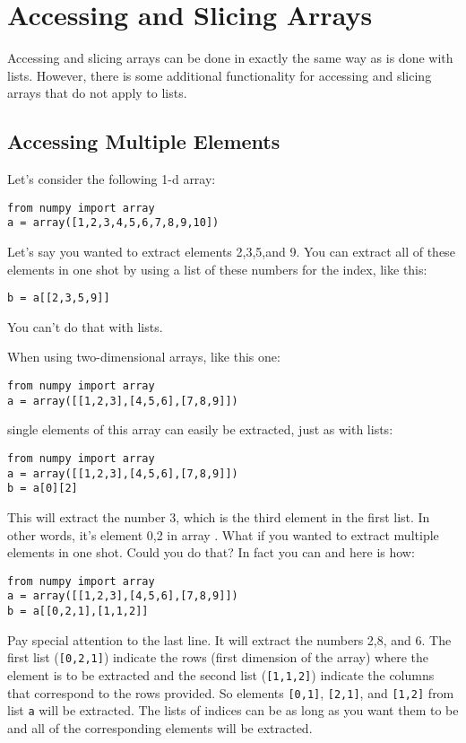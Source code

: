 \section{Accessing and Slicing Arrays}
Accessing and slicing arrays can be done in exactly the same way as is
done with lists.  However, there is some additional functionality for
accessing and slicing arrays that do not apply to lists.
\subsection*{Accessing Multiple Elements}
Let's consider the following 1-d array:
\begin{Verbatim}
from numpy import array
a = array([1,2,3,4,5,6,7,8,9,10])
\end{Verbatim}
Let's say you wanted to extract elements 2,3,5,and 9.  You can extract
all of these elements in one shot by using a list of these numbers for
the index, like this:
\begin{Verbatim}
b = a[[2,3,5,9]]
\end{Verbatim}
You can't do that with lists.

When using two-dimensional arrays, like this one:
\begin{Verbatim}
from numpy import array
a = array([[1,2,3],[4,5,6],[7,8,9]])
\end{Verbatim}
single elements of this array can easily be extracted, just as with
lists:
\begin{Verbatim}
from numpy import array
a = array([[1,2,3],[4,5,6],[7,8,9]])
b = a[0][2]
\end{Verbatim}
This will extract the number 3, which is the third element in the
first list.  In other words, it's element 0,2 in array .
What if you wanted to extract multiple elements in one shot.  Could
you do that?  In fact you can and here is how:
\begin{Verbatim}
from numpy import array
a = array([[1,2,3],[4,5,6],[7,8,9]])
b = a[[0,2,1],[1,1,2]]
\end{Verbatim}
Pay special attention to the last line.  It will extract the numbers
2,8, and 6.  The first list (\texttt{[0,2,1]}) indicate the rows
(first dimension of the array) where the element is to be extracted
and the second list (\texttt{[1,1,2]}) indicate the columns that
correspond to the rows provided.  So elements \texttt{[0,1]},
\texttt{[2,1]}, and \texttt{[1,2]} from list \texttt{a} will be
extracted.  The lists of indices can be as long as you want them to be
and all of the corresponding elements will be extracted.
